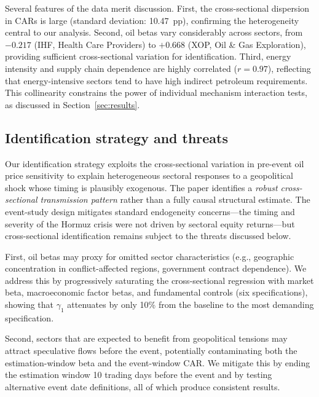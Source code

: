 \documentclass[12pt,preprint,authoryear]{elsarticle}
\begin{document}
Several features of the data merit discussion. First, the cross-sectional dispersion in CARs is large (standard deviation: 10.47~pp), confirming the heterogeneity central to our analysis. Second, oil betas vary considerably across sectors, from $-0.217$ (IHF, Health Care Providers) to $+0.668$ (XOP, Oil \& Gas Exploration), providing sufficient cross-sectional variation for identification. Third, energy intensity and supply chain dependence are highly correlated ($r = 0.97$), reflecting that energy-intensive sectors tend to have high indirect petroleum requirements. This collinearity constrains the power of individual mechanism interaction tests, as discussed in Section~\ref{sec:results}.

\subsection{Identification strategy and threats}
Our identification strategy exploits the cross-sectional variation in pre-event oil price sensitivity to explain heterogeneous sectoral responses to a geopolitical shock whose timing is plausibly exogenous. The paper identifies a \textit{robust cross-sectional transmission pattern} rather than a fully causal structural estimate. The event-study design mitigates standard endogeneity concerns---the timing and severity of the Hormuz crisis were not driven by sectoral equity returns---but cross-sectional identification remains subject to the threats discussed below.

First, oil betas may proxy for omitted sector characteristics (e.g., geographic concentration in conflict-affected regions, government contract dependence). We address this by progressively saturating the cross-sectional regression with market beta, macroeconomic factor betas, and fundamental controls (six specifications), showing that $\gamma_1$ attenuates by only 10\% from the baseline to the most demanding specification.

Second, sectors that are expected to benefit from geopolitical tensions may attract speculative flows before the event, potentially contaminating both the estimation-window beta and the event-window CAR. We mitigate this by ending the estimation window 10 trading days before the event and by testing alternative event date definitions, all of which produce consistent results.

\end{document}
